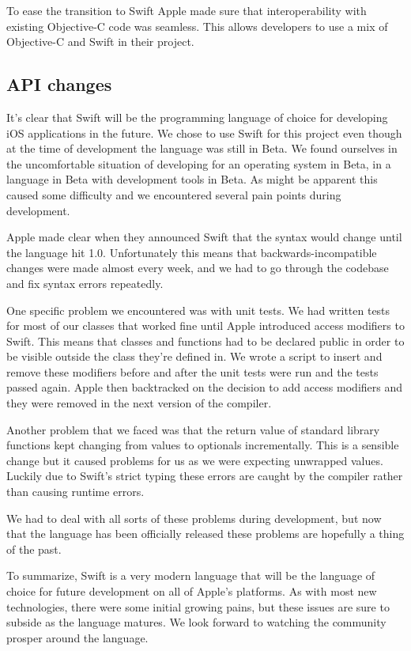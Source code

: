 \documentclass[pdftex, DIV=calc, paper=a4, fontsize=11pt, twocolumn]{scrartcl}	 %
\begin{document}
To ease the transition to Swift Apple made sure that interoperability with existing Objective-C 
code was seamless. This allows developers to use a mix of Objective-C and Swift in their project.

\subsection*{API changes}

It's clear that Swift will be the programming language of choice for developing iOS applications
in the future. We chose to use Swift for this project even though at the time of development the
language was still in Beta. We found ourselves in the uncomfortable situation of developing for an
operating system in Beta, in a language in Beta with development tools in Beta. As might be apparent
this caused some difficulty and we encountered several pain points during development.

Apple made clear when they announced Swift that the syntax would change until the language hit 1.0.
Unfortunately this means that backwards-incompatible changes were made almost every week, and we had
to go through the codebase and fix syntax errors repeatedly.

One specific problem we encountered was with unit tests. We had written tests for most of our classes
that worked fine until Apple introduced access modifiers to Swift. This means that classes and 
functions had to be declared public in order to be visible outside the class they're defined in. We
wrote a script to insert and remove these modifiers before and after the unit tests were run and
the tests passed again. Apple then backtracked on the decision to add access modifiers and they were
removed in the next version of the compiler. 

Another problem that we faced was that the return value of standard library functions kept changing
from values to optionals incrementally. This is a sensible change but it caused problems for us as
we were expecting unwrapped values. Luckily due to Swift's strict typing these errors are caught by
the compiler rather than causing runtime errors.

We had to deal with all sorts of these problems during development, but now that the language has 
been officially released these problems are hopefully a thing of the past.

To summarize, Swift is a very modern language that will be the language of choice for future 
development on all of Apple's platforms. As with most new technologies, there were some initial
growing pains, but these issues are sure to subside as the language matures. 
We look forward to watching the community prosper around the language.
\end{document}
